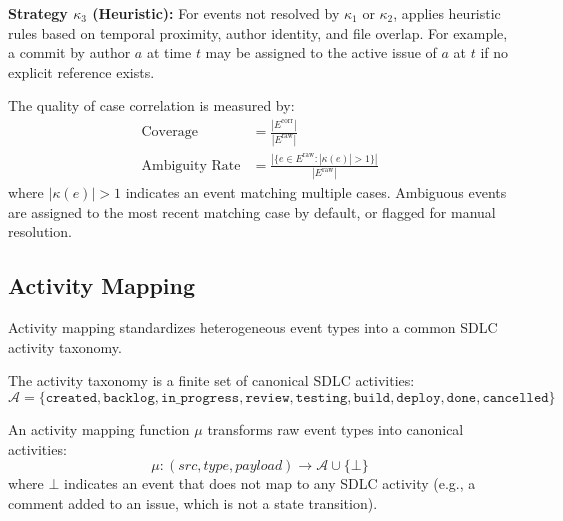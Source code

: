 \textbf{Strategy $\kappa_3$ (Heuristic):} For events not resolved by 
$\kappa_1$ or $\kappa_2$, applies heuristic rules based on temporal 
proximity, author identity, and file overlap. For example, a commit by 
author $a$ at time $t$ may be assigned to the active issue of $a$ at $t$ 
if no explicit reference exists.

\begin{definition}
\label{def:corr-quality}
The quality of case correlation is measured by:
\begin{align}
\text{Coverage} &= \frac{|E^{\text{corr}}|}{|E^{\text{raw}}|} 
    \label{eq:corr-coverage} \\
\text{Ambiguity Rate} &= \frac{|\{e \in E^{\text{raw}} : |\kappa(e)| > 1\}|}{|E^{\text{raw}}|}
    \label{eq:corr-ambiguity}
\end{align}
where $|\kappa(e)| > 1$ indicates an event matching multiple cases. 
Ambiguous events are assigned to the most recent matching case by default, 
or flagged for manual resolution.
\end{definition}


\subsection{Activity Mapping}
\label{sec:s1-mapping}

Activity mapping standardizes heterogeneous event types into a common SDLC 
activity taxonomy.

\begin{definition}
\label{def:activity-taxonomy}
The activity taxonomy is a finite set of canonical SDLC activities:
\begin{equation}
\label{eq:taxonomy}
\mathcal{A} = \{\texttt{created}, \texttt{backlog}, \texttt{in\_progress}, 
    \texttt{review}, \texttt{testing}, \texttt{build}, \texttt{deploy}, 
    \texttt{done}, \texttt{cancelled}\}
\end{equation}
\end{definition}

\begin{definition}
\label{def:activity-map}
An activity mapping function $\mu$ transforms raw event types into 
canonical activities:
\begin{equation}
\label{eq:activity-map}
\mu : (src, type, payload) \to \mathcal{A} \cup \{\bot\}
\end{equation}
where $\bot$ indicates an event that does not map to any SDLC activity 
(e.g., a comment added to an issue, which is not a state transition).
\end{definition}

